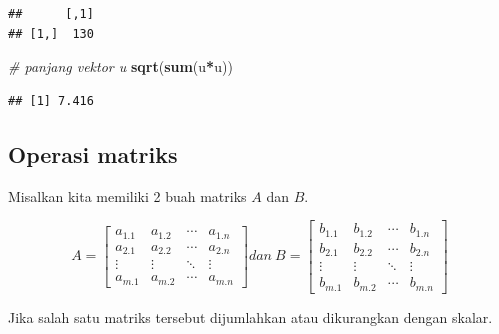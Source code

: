 \documentclass[]{book}
\newenvironment{Shaded}{\begin{snugshade}}{\end{snugshade}}
\newcommand{\CommentTok}[1]{\textcolor[rgb]{0.56,0.35,0.01}{\textit{#1}}}
\newcommand{\KeywordTok}[1]{\textcolor[rgb]{0.13,0.29,0.53}{\textbf{#1}}}
\newcommand{\NormalTok}[1]{#1}
\newcommand{\OperatorTok}[1]{\textcolor[rgb]{0.81,0.36,0.00}{\textbf{#1}}}
\theoremstyle{definition}
\theoremstyle{definition}
\theoremstyle{definition}
\theoremstyle{remark}
\begin{document}
\begin{verbatim}
##      [,1]
## [1,]  130
\end{verbatim}

\begin{Shaded}
\begin{Highlighting}[]
\CommentTok{# panjang vektor u}
\KeywordTok{sqrt}\NormalTok{(}\KeywordTok{sum}\NormalTok{(u}\OperatorTok{*}\NormalTok{u))}
\end{Highlighting}
\end{Shaded}

\begin{verbatim}
## [1] 7.416
\end{verbatim}

\hypertarget{operasimatrik}{%
\subsection{Operasi matriks}\label{operasimatrik}}

Misalkan kita memiliki 2 buah matriks \(A\) dan \(B\).

\begin{equation}
A = \begin{bmatrix}
       a_{1.1} & a_{1.2} &\cdots& a_{1.n}           \\[0.3em]
       a_{2.1} & a_{2.2} &\cdots& a_{2.n}           \\[0.3em]
       \vdots  & \vdots  &\ddots& \vdots            \\[0.3em]
       a_{m.1} & a_{m.2} &\cdots& a_{m.n}
     \end{bmatrix}
dan\ B = \begin{bmatrix}
      b_{1.1} & b_{1.2} &\cdots& b_{1.n}           \\[0.3em]
      b_{2.1} & b_{2.2} &\cdots& b_{2.n}           \\[0.3em]
      \vdots  & \vdots  &\ddots& \vdots            \\[0.3em]
      b_{m.1} & b_{m.2} &\cdots& b_{m.n}
     \end{bmatrix}
  \label{eq:matrikuv}
\end{equation}

Jika salah satu matriks tersebut dijumlahkan atau dikurangkan dengan skalar.
\end{document}
